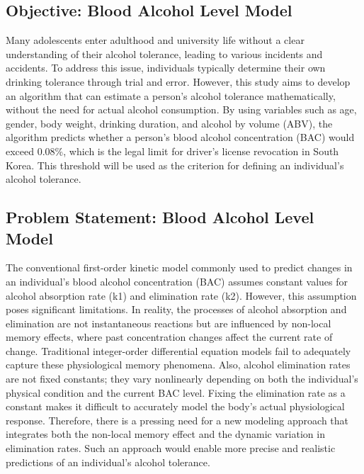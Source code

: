 \documentclass[11pt]{article}
\begin{document}
\subsection{Objective: Blood Alcohol Level Model}
Many adolescents enter adulthood and university life without a clear understanding of their alcohol tolerance, leading to various incidents and accidents. To address this issue, individuals typically determine their own drinking tolerance through trial and error. However, this study aims to develop an algorithm that can estimate a person's alcohol tolerance mathematically, without the need for actual alcohol consumption. By using variables such as age, gender, body weight, drinking duration, and alcohol by volume (ABV), the algorithm predicts whether a person’s blood alcohol concentration (BAC) would exceed 0.08\%, which is the legal limit for driver's license revocation in South Korea. This threshold will be used as the criterion for defining an individual’s alcohol tolerance.
\subsection{Problem Statement: Blood Alcohol Level Model}

The conventional first-order kinetic model commonly used to predict changes in an individual's blood alcohol concentration (BAC) assumes constant values for alcohol absorption rate (k1) and elimination rate (k2).
However, this assumption poses significant limitations. In reality, the processes of alcohol absorption and elimination are not instantaneous reactions but are influenced by non-local memory effects, where past concentration changes affect the current rate of change. Traditional integer-order differential equation models fail to adequately capture these physiological memory phenomena.
Also, alcohol elimination rates are not fixed constants; they vary nonlinearly depending on both the individual's physical condition and the current BAC level. Fixing the elimination rate as a constant makes it difficult to accurately model the body's actual physiological response.
Therefore, there is a pressing need for a new modeling approach that integrates both the non-local memory effect and the dynamic variation in elimination rates. Such an approach would enable more precise and realistic predictions of an individual's alcohol tolerance.
\end{document}
